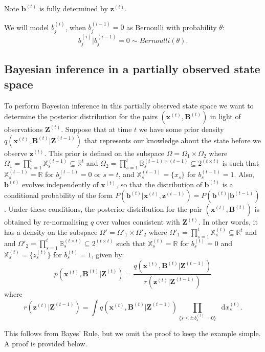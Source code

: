 \documentclass[11pt,a4paper]{article}
\renewcommand{\vec}[1]{\mathbf{#1}}
\newcommand*\diff{\mathop{}\!\mathrm{d}}
\begin{document}
Note $\vec{b}^{(t)}$ is fully determined by $\vec{z}^{(t)}$.

We will model $b_j^{(i)}$, when $b_j^{(i-1)} = 0$ as Bernoulli with probability $\theta$:
\[
b_j^{(i)} | b_j^{(i-1)} = 0 \sim Bernoulli(\theta).
\]


\subsection{Bayesian inference in a partially observed state space}

To perform Bayesian inference in this partially observed state space we want to determine the posterior distribution for the pairs $(\vec{x}^{(t)}, \vec{B}^{(t)})$ in light of observations $\vec{Z}^{(t)}$. Suppose that at time $t$ we have some prior density $q(\vec{x}^{(t)},\vec{B}^{(t)} | \vec{Z}^{(t-1)})$ that represents our knowledge about the state before we observe $\vec{z}^{(t)}$. This prior is defined on the subspace $\Omega = \Omega_1 \times \Omega_2$ where $\Omega_1 = \prod_{s=1}^t \mathbb{X}_s^{(t-1)} \subseteq \mathbb{R}^t$ and $\Omega_2 = \prod_{s=1}^t \mathbb{B}_s^{(t-1) \times (t-1)} \subseteq 2^{(t \times t)}$ is such that $\mathbb{X}_s^{(t-1)} = \mathbb{R}$ for $b_s^{(t-1)} = 0$ or $s=t$, and $\mathbb{X}_s^{(t-1)} = \{ x_s \}$ for $b_s^{(t-1)} = 1$. Also, $\vec{b}^{(t)}$ evolves independently of $\vec{x}^{(t)}$, so that the distribution of $\vec{b}^{(t)}$ is a conditional probability of the form $P(\vec{b}^{(t)} | \vec{x}^{(t)}, \vec{z}^{(t-1)} ) = P( \vec{b}^{(t)} | \vec{b}^{(t-1)} )$. Under these conditions, the posterior distribution for the pair $(\vec{x}^{(t)}, \vec{B}^{(t)})$ is obtained by re-normalising $q$ over values consistent with $\vec{Z}^{(t)}$. In other words, it has a density on the subspace $\Omega' = \Omega'_1 \times \Omega'_2$ where $\Omega'_1 = \prod_{s=1}^t \mathbb{X}_s^{(t)} \subseteq \mathbb{R}^t$ and and $\Omega'_2 = \prod_{s=1}^t \mathbb{B}_s^{(t \times t)} \subseteq 2^{(t \times t)}$ such that $\mathbb{X}_s^{(t)} = \mathbb{R}$ for $b_s^{(t)} = 0$ and $\mathbb{X}_s^{(t)} = \{ z_s^{(t)}\}$ for $b_s^{(t)} = 1$, given by:
\[
p(\vec{x}^{(t)}, \vec{B}^{(t)} | \vec{Z}^{(t)})  =   
\frac{ q(\vec{x}^{(t)}, \vec{B}^{(t)}|\vec{Z}^{(t-1)})} {r(\vec{z}^{(t)} | \vec{Z}^{(t-1)})}
\]
where 
\[
r(\vec{z}^{(t)} | \vec{Z}^{(t-1)}) = \int q(\vec{x}^{(t)}, \vec{B}^{(t)}|\vec{Z}^{(t-1)}) \prod_{\{s \leq t: b_s^{(t)} = 0\}} \diff x_s^{(t)}.
\]

This follows from Bayes' Rule, but we omit the proof to keep the example simple. A proof is provided below.
\end{document}
